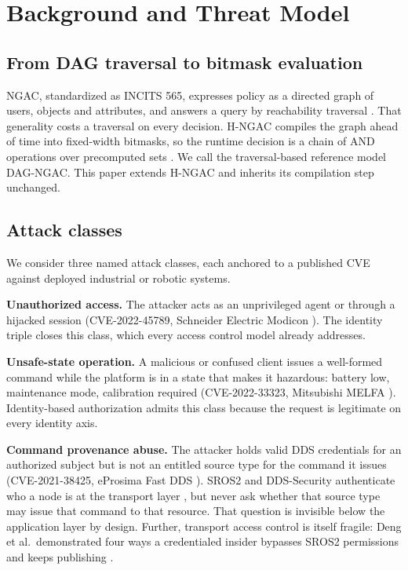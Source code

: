 \documentclass[conference]{IEEEtran}
\begin{document}
\section{Background and Threat Model}
\label{sec:background}

\subsection{From DAG traversal to bitmask evaluation}

NGAC, standardized as INCITS 565, expresses policy as a directed graph of users, objects and attributes, and answers a query by reachability traversal \cite{incits565, ferraiolo2011policymachine}. That generality costs a traversal on every decision. H-NGAC compiles the graph ahead of time into fixed-width bitmasks, so the runtime decision is a chain of AND operations over precomputed sets \cite{karim2026dcas}. We call the traversal-based reference model DAG-NGAC. This paper extends H-NGAC and inherits its compilation step unchanged.

\subsection{Attack classes}

We consider three named attack classes, each anchored to a published CVE against deployed industrial or robotic systems.

\textbf{Unauthorized access.} The attacker acts as an unprivileged agent or through a hijacked session (CVE-2022-45789, Schneider Electric Modicon \cite{cve202245789}). The identity triple closes this class, which every access control model already addresses.

\textbf{Unsafe-state operation.} A malicious or confused client issues a well-formed command while the platform is in a state that makes it hazardous: battery low, maintenance mode, calibration required (CVE-2022-33323, Mitsubishi MELFA \cite{cve202233323}). Identity-based authorization admits this class because the request is legitimate on every identity axis.

\textbf{Command provenance abuse.} The attacker holds valid DDS credentials for an authorized subject but is not an entitled source type for the command it issues (CVE-2021-38425, eProsima Fast DDS \cite{cve202138425}). SROS2 and DDS-Security authenticate who a node is at the transport layer \cite{mayoralvilches2022sros2, omgddssec}, but never ask whether that source type may issue that command to that resource. That question is invisible below the application layer by design. Further, transport access control is itself fragile: Deng et al.\ demonstrated four ways a credentialed insider bypasses SROS2 permissions and keeps publishing \cite{deng2022insecurity}.
\end{document}
